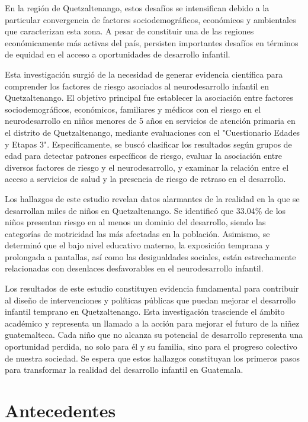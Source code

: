\documentclass[11pt,letterpaper]{report}
\newcommand{\asq}{"Cuestionario Edades y Etapas 3"}
\begin{document}
En la región de Quetzaltenango, estos desafíos se intensifican debido a la
particular convergencia de factores sociodemográficos, económicos y ambientales
que caracterizan esta zona. A pesar de constituir una de las regiones
económicamente más activas del país, persisten importantes desafíos en términos
de equidad en el acceso a oportunidades de desarrollo infantil.

Esta investigación surgió de la necesidad de generar evidencia científica para
comprender los factores de riesgo asociados al neurodesarrollo infantil en
Quetzaltenango. El objetivo principal fue establecer la asociación entre
factores sociodemográficos, económicos, familiares y médicos con el riesgo en el
neurodesarrollo en niños menores de 5 años en servicios de atención primaria en
el distrito de Quetzaltenango, mediante evaluaciones con el \asq.
Específicamente, se buscó clasificar los resultados según grupos de edad para
detectar patrones específicos de riesgo, evaluar la asociación entre diversos
factores de riesgo y el neurodesarrollo, y examinar la relación entre el acceso
a servicios de salud y la presencia de riesgo de retraso en el desarrollo.

Los hallazgos de este estudio revelan datos alarmantes de la realidad en la que
se desarrollan miles de niños en Quetzaltenango. Se identificó que 33.04\% de
los niños presentan riesgo en al menos un dominio del desarrollo, siendo las
categorías de motricidad las más afectadas en la población. Asimismo, se
determinó que el bajo nivel educativo materno, la exposición temprana y
prolongada a pantallas, así como las desigualdades sociales, están estrechamente
relacionadas con desenlaces desfavorables en el neurodesarrollo infantil.

Los resultados de este estudio constituyen evidencia fundamental para contribuir
al diseño de intervenciones y políticas públicas que puedan mejorar el
desarrollo infantil temprano en Quetzaltenango. Esta investigación trasciende el
ámbito académico y representa un llamado a la acción para mejorar el futuro de
la niñez guatemalteca. Cada niño que no alcanza su potencial de desarrollo
representa una oportunidad perdida, no solo para él y su familia, sino para el
progreso colectivo de nuestra sociedad. Se espera que estos hallazgos
constituyan los primeros pasos para transformar la realidad del desarrollo
infantil en Guatemala.

\chapter{Antecedentes}
\end{document}
